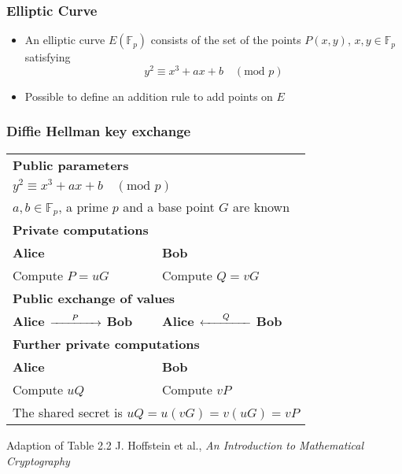 \begin{frame}
  \frametitle{Elliptic Curve}
  \begin{itemize}
  \setlength\itemsep{1.5em}
  \item{
  An elliptic curve $E(\mathbb{F}_p)$ consists of the set of the points $P(x,y)$, $x,y \in \mathbb{F}_p$ satisfying
  \begin{equation*}
  y^2 \equiv x^3 + ax + b \quad (\text{mod } p)
  \end{equation*}
  }
  \item{
  Possible to define an addition rule to add points on $E$
  }
  \end{itemize}
\end{frame}
\begin{frame}
  \frametitle{Diffie Hellman key exchange}
  \begin{tabular}{|p{5cm} p{5cm} |}
      \hline			
      \multicolumn{2}{|p{10cm}|}{\rule{0em}{1.2em}\bf{Public parameters}}\\
      \multicolumn{2}{|p{10cm}|}{$ y^2 \equiv x^3 + ax + b \quad (\text{mod } p)$}\\
      \multicolumn{2}{|p{10cm}|}{$a,b \in \mathbb{F}_p$, a prime $p$ and a base point $G$ are known}\\
      \hline
      \multicolumn{2}{|p{10cm}|}{\rule{0em}{1.2em}\bf{Private computations}}\\
      \bf{\small{Alice}} & \bf{\small{Bob}}\\
      Compute $P = uG$ &  Compute $Q = vG$ \\
      \hline
      \multicolumn{2}{|p{10cm}|}{\rule{0em}{1.2em}\bf{Public exchange of values}}\\
      \bf{\small{Alice}} $\xrightarrow{\hspace*{0.6cm}P\hspace*{0.6cm}}$ \bf{\small{Bob}}
      &
      \bf{\small{Alice}} $\xleftarrow{\hspace*{0.6cm}Q\hspace*{0.6cm}}$ \bf{\small{Bob}}
      \\
      \hline
      \multicolumn{2}{|p{10cm}|}{\rule{0em}{1.2em}\bf{Further private computations}}\\
      \bf{\small{Alice}} & \bf{\small{Bob}}\\
      Compute $uQ$ & Compute $vP$ \\
      \multicolumn{2}{|p{10cm}|}{
      The shared secret is $uQ = u(vG) = v(uG) = vP$}\\ \hline
    \end{tabular}
    \vfill
    \tiny{Adaption of Table 2.2 J. Hoffstein et al., \emph{An Introduction to Mathematical Cryptography}}
\end{frame}
